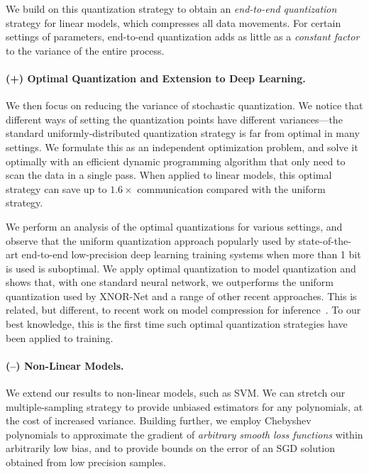 \documentclass{article}
\begin{document}
\vspace{-0.5em}
We build on this quantization strategy to obtain an \emph{end-to-end quantization} strategy
for linear models, which compresses all data movements. 
For certain settings of parameters, end-to-end quantization adds as little as a \emph{constant factor} to the variance of the entire process. 

\vspace{-1.5em}
\paragraph{(+) Optimal Quantization and Extension to Deep Learning.}
We then focus on reducing the variance of  
stochastic quantization. We notice that different ways of setting the quantization points have different variances---the standard uniformly-distributed quantization strategy is far from optimal in many settings.
We formulate this as an independent optimization problem, and solve it optimally with 
an efficient dynamic programming algorithm 
that only need to scan the data in a single pass.
When applied to linear models, this optimal 
strategy can save up to $1.6\times$ communication
compared with the uniform strategy.

\vspace{-0.5em}
We perform an analysis of the optimal quantizations for various settings, and observe that the uniform quantization approach
popularly used by state-of-the-art end-to-end
low-precision deep learning training systems
when more than 1 bit is used is suboptimal.
We apply optimal quantization to 
model quantization and shows that, with one
standard neural network, we outperforms the
uniform quantization used by XNOR-Net and a
range of other recent approaches. This
is related, but different, to recent work 
on model compression for inference~\cite{Han:2016:ICLR}. 
To our best knowledge, this is the first time such optimal quantization strategies have been applied to training. 

\vspace{-1.5em}
\paragraph{(--) Non-Linear Models.} We extend our
results to non-linear models, such as SVM. We can stretch our multiple-sampling strategy to provide 
unbiased estimators for any polynomials, at the cost of increased variance. 
Building further, we employ Chebyshev polynomials to   
approximate the gradient of \emph{arbitrary smooth loss functions} within arbitrarily low bias, 
and to provide bounds on the error of an SGD solution obtained from low precision samples. 
%
%
\end{document}
